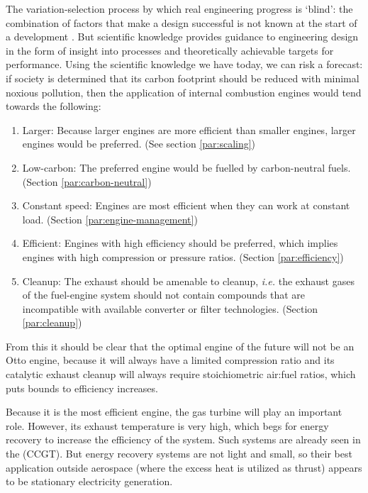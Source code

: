 The variation-selection process by which real engineering progress is `blind':
the combination of factors that make a design successful is not known at the
start of a development \autocite{Vincenti1990}. But scientific knowledge
provides guidance to engineering design in the form of insight into processes
and theoretically achievable targets for performance. Using the scientific
knowledge we have today, we can risk a forecast: if society is determined that
its carbon footprint should be reduced with minimal noxious pollution, then the
application of internal combustion engines would tend towards the following:

\begin{enumerate}
  
  \item Larger: Because larger engines are more efficient than smaller engines,
  larger engines would be preferred. (See section \ref{par:scaling})
  
  \item Low-carbon: The preferred engine would be fuelled by carbon-neutral
  fuels. (Section \ref{par:carbon-neutral})
  
  \item Constant speed: Engines are most efficient when they can work at
  constant load. (Section \ref{par:engine-management})
  
  \item Efficient: Engines with high efficiency should be preferred, which
  implies engines with high compression or pressure ratios. (Section
  \ref{par:efficiency})
  
  \item Cleanup: The exhaust should be amenable to cleanup, \textit{i.e.} the
  exhaust gases of the fuel-engine system should not contain compounds that are
  incompatible with available converter or filter technologies. (Section
  \ref{par:cleanup})
     
\end{enumerate} 

From this it should be clear that the optimal engine of the future will not be
an Otto engine, because it will always have a limited compression ratio and its
catalytic exhaust cleanup will always require stoichiometric air:fuel ratios,
which puts bounds to efficiency increases.

Because it is the most efficient engine, the gas turbine will play an important
role. However, its exhaust temperature is very high, which begs for energy
recovery to increase the efficiency of the system. Such systems are already seen
in the  (CCGT). But energy recovery systems
are not light and small, so their best application outside aerospace (where the
excess heat is utilized as thrust) appears to be stationary electricity
generation.


